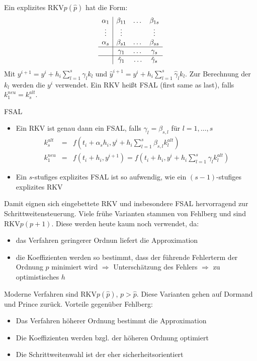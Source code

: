 \begin{definition}
	 Ein explizites RKV$p(\hat p)$ hat die Form:
	$$\begin{array}{c|ccc}
			\alpha_1 & \beta_{11} & \dots & \beta_{1s} \\
			\vdots   & \vdots     &       & \vdots \\
			\alpha_s & \beta_{s1} & \dots & \beta_{ss} \\
			\hline & \gamma_{1} & \dots & \gamma_{s} \\
			\hline & \hat \gamma_{1}& \ldots & \hat \gamma_{s}
		\end{array}$$
		Mit $y^{i+1}=y^{i}+h_{i}\sum_{l=1}^{s}\gamma_{l}k_{l}$ und $\hat y^{i+1}= y^{i}+ h_{i}\sum_{l=1}^{s}\hat \gamma_{l}k_{l}$.
		Zur Berechnung der $k_{l}$ werden die $y^{i}$ verwendet. Ein RKV heißt FSAL (first same as last), falls $k_{1}^{neu}=k_{s}^{alt}$.
\end{definition}

\begin{remark}
	FSAL
	\begin{itemize}
		\item Ein RKV ist genau dann ein FSAL, falls $\gamma_{l}=\beta_{s,l}$ für $l=1,\ldots,s$
		\begin{eqnarray*}
			k_{s}^{alt} &=& f(t_{i}+\alpha_{s}h_{i},y^{i}+h_{i}\sum_{l=1}^{s}\beta_{s,l}k_{l}^{alt})\\
			k_{1}^{neu} &=&f(t_{i}+h_{i},y^{i+1})=f(t_{i}+h_{i},y^{i}+h_{i}\sum_{l=1}^{s}\gamma_{l}k_{l}^{alt})
		\end{eqnarray*}
		\item Ein $s$-stufiges explizites FSAL ist so aufwendig, wie ein $(s-1)$-stufiges explizites RKV
	\end{itemize}
	
	Damit eignen sich eingebettete RKV und insbesondere FSAL hervorragend zur Schrittweitensteuerung.
	Viele frühe Varianten stammen von Fehlberg und sind RKV$p(p+1)$. Diese werden heute kaum noch verwendet, da:
	\begin{itemize}
		\item das Verfahren geringerer Ordnun liefert die Approximation
		\item die Koeffizienten werden so bestimmt, dass der führende Fehlerterm der Ordnung $p$ minimiert wird $\Rightarrow$ Unterschätzung
		des Fehlers $\Rightarrow$ zu optimistisches $h$
	\end{itemize}
	Moderne Verfahren sind RKV$p(\hat p)$, $p>\hat p$. Diese Varianten gehen auf Dormand und Prince zurück. Vorteile gegenüber Fehlberg:
	\begin{itemize}
		\item Das Verfahren höherer Ordnung bestimmt die Approximation
		\item Die Koeffizienten werden bzgl. der höheren Ordnung optimiert
		\item Die Schrittweitenwahl ist der eher sicherheitsorientiert
	\end{itemize}
\end{remark}

